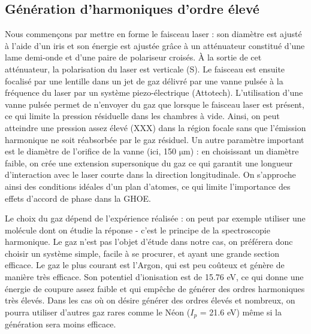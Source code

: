 \subsection{Génération d'harmoniques d'ordre élevé}
Nous commençons par mettre en forme le faisceau laser : son diamètre est ajusté à l'aide d'un iris et son énergie est ajustée grâce à un atténuateur constitué d'une lame demi-onde et d'une paire de polariseur croisés. \`{A} la sortie de cet atténuateur, la polarisation du laser est verticale (S). Le faisceau est ensuite focalisé par une lentille dans un jet de gaz délivré par une vanne pulsée à la fréquence du laser par un système piezo-électrique (Attotech). L'utilisation d'une vanne pulsée permet de n'envoyer du gaz que lorsque le faisceau laser est présent, ce qui limite la pression résiduelle dans les chambres à vide. Ainsi, on peut atteindre une pression assez élevé (XXX) dans la région focale sans que l'émission harmonique ne soit réabsorbée par le gaz résiduel. Un autre paramètre important est le diamètre de l'orifice de la vanne (ici, 150 $\si{\micro\metre}$) : en choisissant un diamètre faible, on crée une extension supersonique du gaz ce qui garantit une longueur d'interaction avec le laser courte dans la direction longitudinale. On s'approche ainsi des conditions idéales d'un plan d'atomes, ce qui limite l'importance des effets d'accord de phase dans la GHOE. \par
Le choix du gaz dépend de l'expérience réalisée : on peut par exemple utiliser une molécule dont on étudie la réponse - c'est le principe de la spectroscopie harmonique. Le gaz n'est pas l'objet d'étude dans notre cas, on préférera donc choisir un système simple, facile à se procurer, et ayant une grande section efficace. Le gaz le plus courant est l'Argon, qui est peu coûteux et génère de manière très efficace. Son potentiel d'ionisation est de 15.76 eV, ce qui donne une énergie de coupure assez faible et qui empêche de générer des ordres harmoniques très élevés. Dans les cas où on désire générer des ordres élevés et nombreux, on pourra utiliser d'autres gaz rares comme le Néon ($I_p$ = 21.6 eV) même si la génération sera moins efficace.

